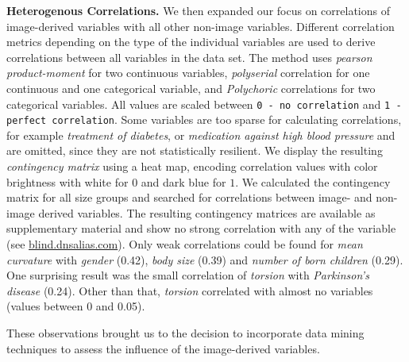 \documentclass[a4paper,twoside]{style/article}
\begin{document}
\noindent \textbf{Heterogenous Correlations.}
We then expanded our focus on correlations of image-derived variables with all other non-image variables.
Different correlation metrics depending on the type of the individual variables are used to derive correlations between all variables in the data set.
The method uses \emph{pearson product-moment} for two continuous variables, \emph{polyserial} correlation for one continuous and one categorical variable, and \emph{Polychoric} correlations for two categorical variables.
All values are scaled between \texttt{0 - no correlation} and \texttt{1 - perfect correlation}.
Some variables are too sparse for calculating correlations, for example \emph{treatment of diabetes}, or \emph{medication against high blood pressure} and are omitted, since they are not statistically resilient.
We display the resulting \emph{contingency matrix} using a heat map, encoding correlation values with color brightness with white for $0$ and dark blue for $1$.
We calculated the contingency matrix for all size groups and searched for correlations between image- and non-image derived variables.
The resulting contingency matrices are available as supplementary material and show no strong correlation with any of the variable (see \url{blind.dnsalias.com}).
Only weak correlations could be found for \emph{mean curvature} with \emph{gender} (0.42), \emph{body size} (0.39) and \emph{number of born children} (0.29).
One surprising result was the small correlation of \emph{torsion} with \emph{Parkinson's disease} (0.24).
Other than that, \emph{torsion} correlated with almost no variables (values between 0 and 0.05).

These observations brought us to the decision to incorporate data mining techniques to assess the influence of the image-derived variables.
\end{document}
